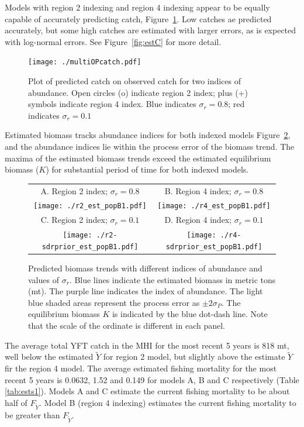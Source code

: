 \documentclass[12pt,letterpaper]{article}
\newcommand\MSY{\widetilde{Y}}
\newcommand\Fmsy{F_{\MSY}}
\begin{document}
Models with region 2 indexing and region 4 indexing appear to be
equally capable of accurately predicting catch,
Figure~\ref{fig:mopcatch}. Low catches ae predicted
accurately, but some high catches are estimated with larger errors, as is
expected with log-normal errors. 
See Figure~\ref{fig:estC} for more detail.


\begin{figure}
\begin{center}
\texttt{[image: ./multiOPcatch.pdf]}
\caption{Plot of predicted catch on observed catch for two indices of
abundance.
Open circles (o) indicate region 2 index; plus (+) symbols indicate
region 4 index.
Blue indicates $\sigma_r=0.8$; red indicates $\sigma_r=0.1$
\label{fig:mopcatch}
}
\end{center}
\end{figure}

Estimated biomass tracks abundance indices for both indexed models
Figure~\ref{fig:estbiomass}, and the abundance indices lie within the
process error of the biomass trend.
The maxima of the estimated biomass trends exceed the
estimated equilibrium biomass ($K$) for substantial period of time for
both indexed models.


\begin{figure}
\begin{center}
{\scriptsize \sffamily
\begin{tabular}{cc}
A. Region 2 index; $\sigma_r=0.8$ &
B. Region 4 index; $\sigma_r=0.8$ \\
\texttt{[image: ./r2\_est\_popB1.pdf]} &
\texttt{[image: ./r4\_est\_popB1.pdf]} \\
C. Region 2 index; $\sigma_r=0.1$ &
D. Region 4 index; $\sigma_r=0.1$ \\
\texttt{[image: ./r2-sdrprior\_est\_popB1.pdf]} &
\texttt{[image: ./r4-sdrprior\_est\_popB1.pdf]} \\
\end{tabular}
}
\caption{Predicted biomass trends with different indices of abundance
and values of $\sigma_r$.
Blue lines indicate the estimated biomass in metric tons (mt).
The purple line indicates the index of abundance.
The light blue shaded areas represent the process error as 
$\pm 2\sigma_P$.
The equilibrium biomass $K$ is indicated by the blue dot-dash line.
Note that the scale of the ordinate is different in each panel.
\label{fig:estbiomass}}
\end{center}
\end{figure}

The average total YFT catch in the MHI for the most recent 5 years
is 818 mt, well below the estimated $\MSY$ for region 2 model, but
slightly above the estimate $\MSY$ fir the region 4 model.
The average estimated fishing mortality for the most recent 5 years 
is 0.0632, 1.52 and 0.149 for models A, B and C respectively
(Table \ref{tab:ests1}).
Models A and C estimate the current fishing mortality to be about half
of $\Fmsy$.  Model B (region 4 indexing) estimates the current fishing
mortality to be greater than $\Fmsy$.
\end{document}

